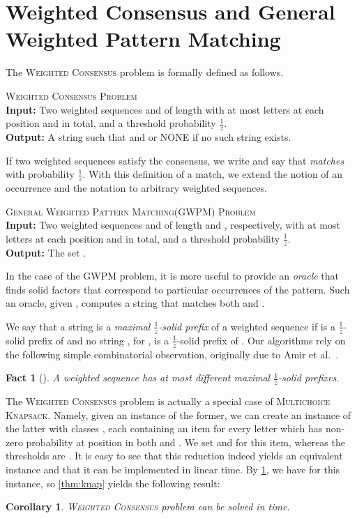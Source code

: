 \documentclass{article}
\theoremstyle{plain}
\newtheorem{corollary}[theorem]{Corollary}
\newtheorem{fact}[theorem]{Fact}
\theoremstyle{definition}
\newenvironment{dsproblem}[1]
{\begin{center}\begin{lrbox}{\mybox}\begin{minipage}{0.96\columnwidth}#1 \textsc{Problem}\\}
{\end{minipage}\end{lrbox}\fbox{\usebox{\mybox}}\end{center}}
\newcommand{\defdsproblem}[3]{
  \begin{dsproblem}{#1}
\textbf{Input:} #2\\
\textbf{Output:} #3
  \end{dsproblem}
  }
\newcommand{\MK}{\textsc{Multichoice Knapsack}\xspace}
\newcommand{\GWPM}{\textsc{GWPM}\xspace}
\newcommand{\GWPMFull}{\textsc{General Weighted Pattern Matching}\xspace}
\newcommand{\WC}{\textsc{Weighted Consensus}\xspace}
\newcommand{\fr}{\ensuremath{\frac1z}}
\begin{document}
  
 

  \section{Weighted Consensus and General Weighted Pattern Matching}\label{sec:GWPMReduction}
    The \WC problem is formally defined as follows.
    \defdsproblem{\WC}{
      Two weighted sequences  and  of length  with at most  letters at each position and  in total,
      and a threshold probability \fr.
    }{
      A string  such that  and  or NONE if no such string exists.
    }

    If two weighted sequences satisfy the consensus, we write  and say that  \emph{matches} 
    with probability \fr.
    With this definition of a match, we extend the notion of an occurrence and the notation  to arbitrary weighted sequences.

    \defdsproblem{\GWPMFull (\GWPM)}{
      Two weighted sequences  and  of length  and , respectively, with at most  letters at each position
      and  in total, and a threshold probability \fr.
    }{
      The set .
    }

    In the case of the \GWPM problem, it is more useful to provide an \emph{oracle} that finds solid factors that correspond to particular occurrences of the pattern.
    Such an oracle, given , computes a string that matches both  and .




    We say that a string  is a \emph{maximal \fr-solid prefix} of a weighted sequence 
    if  is a \fr-solid prefix of  and no string , for , is a \fr-solid prefix of .
    Our algorithms rely on the following simple combinatorial observation, originally due to Amir et al.\ \cite{amir_weighted_property_matching_j}.

    \begin{fact}[\cite{amir_weighted_property_matching_j}]\label{fct:maxprefixes}
      A weighted sequence has at most  different maximal \fr-solid prefixes.
    \end{fact}


    The \WC problem is actually a special case of \MK.
    Namely, given an instance of the former, we can create an instance of the latter with  classes ,
    each containing an item  for every letter  which has non-zero probability at position  in both  and .
    We set  and  for this item,
    whereas the thresholds are . It is easy to see that this reduction indeed yields an equivalent instance
    and that it can be implemented in linear time.
    By \cref{fct:maxprefixes}, we have  for this instance, so \cref{thm:knap} yields the following result:
    \begin{corollary}\label{cor:red_simple}
    \WC problem can be solved in  time.
    \end{corollary}
    
\end{document}
